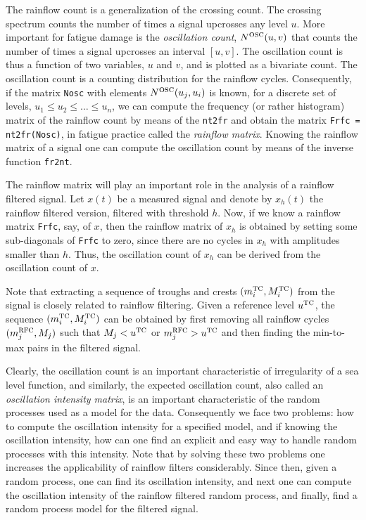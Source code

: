 The rainflow count is a generalization of the crossing count. The crossing
spectrum counts the number of times a signal upcrosses any level $u$. More
important for fatigue damage is the 
\emph{oscillation count},
$N^{{\protect\mbox{\protect\small\protect\sc osc}}}(u,v)$ that counts the number of times a signal upcrosses
an interval $[u,v]$. The oscillation count is thus a function of two
variables, $u$ and $v$, and is plotted as a bivariate count. The oscillation
count is a counting distribution for the rainflow cycles.
Consequently, if the matrix {\tt Nosc} with elements
$N^{{\protect\mbox{\protect\small\protect\sc osc}}}(u_j,u_i)$ is known, for a discrete set of levels,
$u_1 \leq u_2 \leq \ldots \leq u_n$, we can compute the frequency (or rather
histogram) matrix of the rainflow count by means of the
{\tt nt2fr} and obtain the matrix {\tt Frfc = nt2fr(Nosc)}, in fatigue
practice called the {\sl rainflow matrix}.
Knowing the
rainflow matrix of a signal one can compute the oscillation
count by means of the inverse function {\tt fr2nt}.

The rainflow matrix will play an important role in the analysis
of a rainflow filtered signal. Let $x(t)$ be a measured
signal and denote by $x_h(t)$ the rainflow filtered version, filtered with
threshold $h$. Now, if we know a rainflow matrix {\tt Frfc}, say, of
$x$, then the rainflow matrix of $x_h$ is obtained by setting some
sub-diagonals of {\tt Frfc} to zero, since there are no cycles in
$x_h$ with amplitudes smaller than $h$. Thus, the oscillation
count of $x_h$ can be derived from the oscillation
count of $x$.

Note that extracting a sequence of troughs and crests
$(m_i^{{\protect\mbox{\protect\small\protect\sc tc}}},M_i^{{\protect\mbox{\protect\small\protect\sc tc}}})$ from the signal is closely related to rainflow
filtering. Given a reference level $u^{{\protect\mbox{\protect\small\protect\sc tc}}}$, the sequence
$(m_i^{{\protect\mbox{\protect\small\protect\sc tc}}},M_i^{{\protect\mbox{\protect\small\protect\sc tc}}})$ can be obtained by first removing all
rainflow cycles $(m_j^{{\protect\mbox{\protect\small\protect\sc rfc}}},M_j)$  such that $M_j<u^{{\protect\mbox{\protect\small\protect\sc tc}}}$ or
$m_j^{{\protect\mbox{\protect\small\protect\sc rfc}}}>u^{{\protect\mbox{\protect\small\protect\sc tc}}}$  and then finding the min-to-max pairs in the filtered
signal.

Clearly, the oscillation count is an important characteristic
of irregularity of a sea level function, and similarly,
the expected oscillation
count, also called an
\emph{oscillation intensity matrix}, 
is an important
characteristic of the random processes used as a model for the data.
Consequently we face two
problems: how to compute the oscillation intensity for a
specified model, and if knowing the oscillation intensity,
how can one find an explicit and easy way to handle random processes with
this intensity. Note that by solving these two problems one
increases the applicability of rainflow filters considerably.
Since then, given a random process, one can find its oscillation intensity,
and next one can compute the oscillation intensity
of the rainflow filtered random process, and finally, find
a random process model for the filtered signal.

